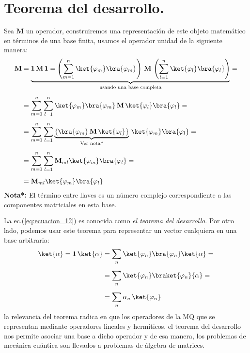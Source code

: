 \section{Teorema del desarrollo.}

Sea $\mathbf{M}$ un operador, construiremos una representación de este objeto matemático en términos de una base finita, usamos el operador unidad de la siguiente manera:
\begin{align}
\begin{aligned}[b]
\mathbf{M} &= \underbrace{\mathbf{1 \, M \, 1} =  \left( \sum_{m=1}^{n} \ket{\varphi_{m}} \bra{\varphi_{m}} \right) \, \mathbf{M} \, \left( \sum_{l=1}^{n} \ket{\varphi_{l}} \bra{\varphi_{l}} \right)}_{\text{usando una base completa}} = \\[0.5em]
&= \sum_{m=1}^{n} \sum_{l=1}^{n} \ket{\varphi_{m}} \bra{\varphi_{m}} \, \mathbf{M} \, \ket{\varphi_{l}} \bra{\varphi_{l}} = \\[0.5em]
&= \sum_{m=1}^{n} \sum_{l=1}^{n} \underbrace{\left\{ \bra{\varphi_{m}} \, \mathbf{M} \, \ket{\varphi_{l}} \right\}}_{\text{Ver nota*}} \, \ket{\varphi_{m}} \bra{\varphi_{l}} = \\[0.5em]
&= \sum_{m=1}^{n} \sum_{l=1}^{n} \mathbf{M}_{ml} \ket{\varphi_{m}} \bra{\varphi_{l}} = \\[0.5em]
&= \mathbf{M}_{ml} \ket{\varphi_{m}} \bra{\varphi_{l}}
\end{aligned}
\label{eq:ecuacion_12}
\end{align}
\textbf{Nota*: } El término entre llaves es un número complejo correspondiente a las componentes matriciales en esta base.
\par
La ec.(\ref{eq:ecuacion_12}) es conocida como \emph{el teorema del desarrollo}. Por otro lado, podemos usar este teorema para representar un vector cualquiera en una base arbitraria:
\begin{align}
\begin{aligned}[b]
\ket{\alpha} = \mathbf{1} \, \ket{\alpha} &= \sum_{n} \ket{\varphi_{n}} \bra{\varphi_{n}} \ket{\alpha} = \\[0.5em]
&= \sum_{n} \ket{\varphi_{n}} \braket{\varphi_{n}}{\alpha} = \\[0.5em]
&= \sum_{n} \alpha_{n} \, \ket{\varphi_{n}}
\end{aligned}
\label{eq:ecuacion_13}
\end{align}
la relevancia del teorema radica en que los operadores de la MQ que se representan mediante operadores lineales y hermíticos, el teorema del desarrollo nos permite asociar una base a dicho operador y de esa manera, los problemas de mecánica cuántica son llevados a problemas de álgebra de matrices.
